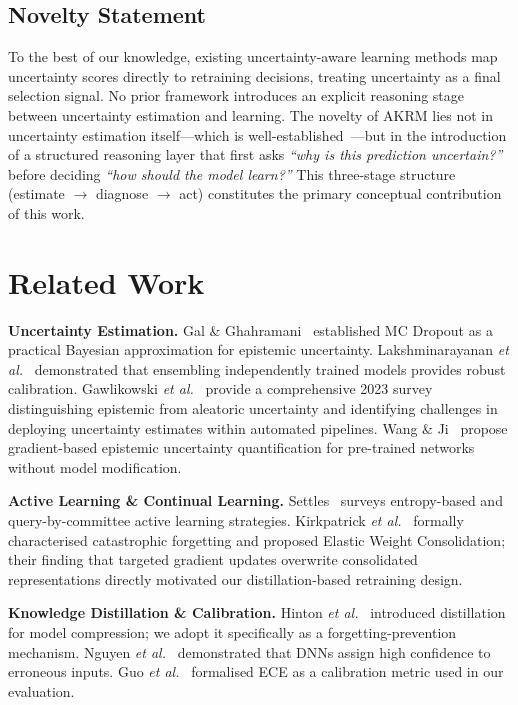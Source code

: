 \documentclass[conference]{IEEEtran}
\begin{document}
\subsection{Novelty Statement}
To the best of our knowledge, existing uncertainty-aware learning methods map uncertainty scores directly to retraining decisions, treating uncertainty as a final selection signal. No prior framework introduces an explicit reasoning stage between uncertainty estimation and learning. The novelty of AKRM lies not in uncertainty estimation itself---which is well-established~\cite{gal2016dropout,lakshminarayanan2017simple,gawlikowski2023survey}---but in the introduction of a structured reasoning layer that first asks \emph{``why is this prediction uncertain?''} before deciding \emph{``how should the model learn?''} This three-stage structure (estimate $\rightarrow$ diagnose $\rightarrow$ act) constitutes the primary conceptual contribution of this work.

\section{Related Work}

\textbf{Uncertainty Estimation.}
Gal \& Ghahramani~\cite{gal2016dropout} established MC Dropout as a practical Bayesian approximation for epistemic uncertainty. Lakshminarayanan \emph{et al.}~\cite{lakshminarayanan2017simple} demonstrated that ensembling independently trained models provides robust calibration. Gawlikowski \emph{et al.}~\cite{gawlikowski2023survey} provide a comprehensive 2023 survey distinguishing epistemic from aleatoric uncertainty and identifying challenges in deploying uncertainty estimates within automated pipelines. Wang \& Ji~\cite{wang2024epistemic} propose gradient-based epistemic uncertainty quantification for pre-trained networks without model modification.

\textbf{Active Learning \& Continual Learning.}
Settles~\cite{settles2009active} surveys entropy-based and query-by-committee active learning strategies. Kirkpatrick \emph{et al.}~\cite{kirkpatrick2017overcoming} formally characterised catastrophic forgetting and proposed Elastic Weight Consolidation; their finding that targeted gradient updates overwrite consolidated representations directly motivated our distillation-based retraining design.

\textbf{Knowledge Distillation \& Calibration.}
Hinton \emph{et al.}~\cite{hinton2015distilling} introduced distillation for model compression; we adopt it specifically as a forgetting-prevention mechanism. Nguyen \emph{et al.}~\cite{nguyen2015fooled} demonstrated that DNNs assign high confidence to erroneous inputs. Guo \emph{et al.}~\cite{guo2017calibration} formalised ECE as a calibration metric used in our evaluation.
\end{document}
